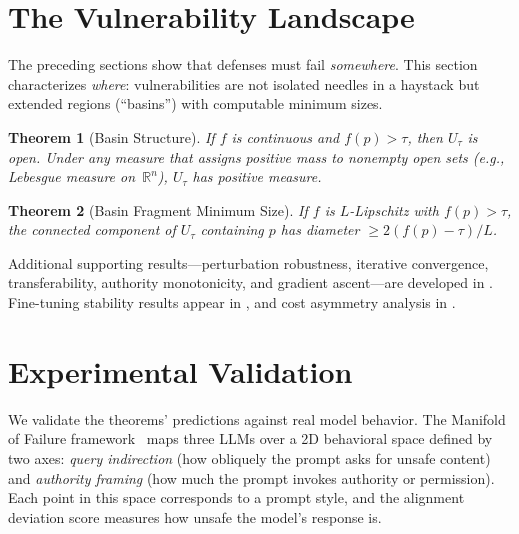 \documentclass[11pt]{article}
\newtheorem{theorem}{Theorem}[section]
\newcommand{\R}{\mathbb{R}}
\begin{document}
\section{The Vulnerability Landscape}
\label{sec:landscape}

The preceding sections show that defenses must fail \emph{somewhere}.
This section characterizes \emph{where}: vulnerabilities are not
isolated needles in a haystack but extended regions (``basins'') with
computable minimum sizes.

\begin{theorem}[Basin Structure]
\label{thm:basin}
If $f$ is continuous and $f(p)>\tau$, then $U_\tau$ is open. Under
any measure that assigns positive mass to nonempty open sets (e.g.,
Lebesgue measure on~$\R^n$), $U_\tau$ has positive measure.
\end{theorem}

\begin{theorem}[Basin Fragment Minimum Size]
\label{thm:fragment}
If $f$ is $L$-Lipschitz with $f(p) > \tau$, the connected component
of $U_\tau$ containing $p$ has diameter $\geq 2(f(p) - \tau)/L$.
\end{theorem}

Additional supporting results---perturbation robustness, iterative
convergence, transferability, authority monotonicity, and gradient
ascent---are developed in . Fine-tuning stability
results appear in , and cost asymmetry analysis
in .


\section{Experimental Validation}
\label{sec:experiments}

We validate the theorems' predictions against real model behavior. The
Manifold of Failure framework~\cite{munshi2026manifold} maps three LLMs
over a 2D behavioral space defined by two axes: \emph{query indirection}
(how obliquely the prompt asks for unsafe content) and \emph{authority
framing} (how much the prompt invokes authority or permission). Each
point in this space corresponds to a prompt style, and the alignment
deviation score measures how unsafe the model's response is.
\end{document}
